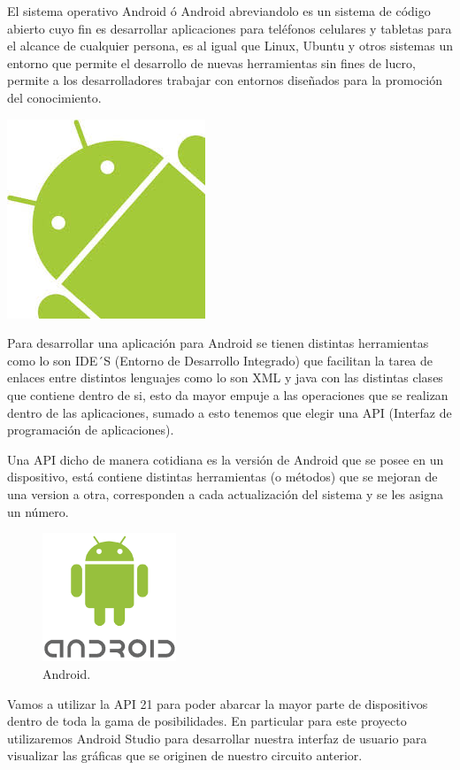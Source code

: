 El sistema operativo Android ó Android abreviandolo es un sistema de código abierto cuyo fin es desarrollar aplicaciones para teléfonos celulares y tabletas para el alcance de cualquier persona, es al igual que Linux, Ubuntu y otros sistemas un entorno que permite el desarrollo de nuevas herramientas sin fines de lucro, permite a los desarrolladores trabajar con entornos diseñados para la promoción del conocimiento.
\begin{floatingfigure}[r]{1cm}
\includegraphics{imag/mini.jpg}
\end{floatingfigure}
Para desarrollar una aplicación para Android se tienen distintas herramientas como lo son IDE´S (Entorno de Desarrollo Integrado) que facilitan la tarea de enlaces entre distintos lenguajes como lo son XML y java con las distintas clases que contiene dentro de si, esto da mayor empuje a las operaciones que se realizan dentro de las aplicaciones, sumado a esto tenemos que elegir una API (Interfaz de programación de aplicaciones).\newline

Una API dicho de manera cotidiana es la versión de Android que se posee en un dispositivo, está contiene distintas herramientas (o métodos) que se mejoran de una version a otra, corresponden a cada actualización del sistema y se les asigna un número.\newline
\begin{figure}
   	\centering
		\includegraphics[width=4cm]{imag/androidmini.PNG}
		\caption{Android.}
		\label{andro}
\end{figure}
\newpage

Vamos a utilizar la API 21 para poder abarcar la mayor parte de dispositivos dentro de toda la gama de posibilidades. En particular para este proyecto utilizaremos Android Studio para desarrollar nuestra interfaz de usuario para visualizar las gráficas que se originen de nuestro circuito anterior.
